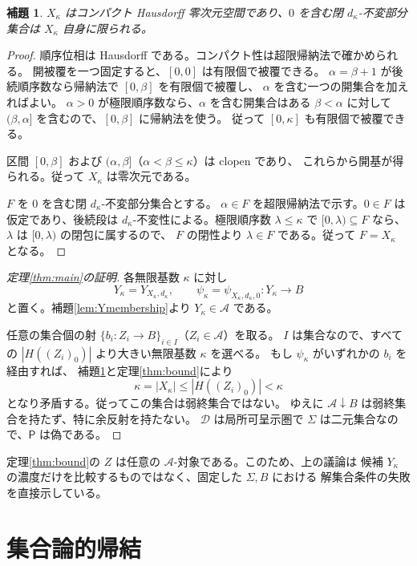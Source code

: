 \documentclass[a4paper,11pt]{ltjsarticle}
\theoremstyle{japaneseplain}
\newtheorem{lemma}[theorem]{補題}
\newcommand{\D}{\mathcal D}
\newcommand{\A}{\mathcal A}
\newcommand{\Pstmt}{\mathsf P}
\begin{document}
\begin{lemma}\label{lem:ordinal}
$X_\kappa$ はコンパクト Hausdorff 零次元空間であり、$0$ を含む閉 $d_\kappa$-不変部分集合は
$X_\kappa$ 自身に限られる。
\end{lemma}
\begin{proof}
順序位相は Hausdorff である。コンパクト性は超限帰納法で確かめられる。
開被覆を一つ固定すると、$[0,0]$ は有限個で被覆できる。
$\alpha=\beta+1$ が後続順序数なら帰納法で $[0,\beta]$ を有限個で被覆し、
$\alpha$ を含む一つの開集合を加えればよい。
$\alpha>0$ が極限順序数なら、$\alpha$ を含む開集合はある $\beta<\alpha$ に対して
$(\beta,\alpha]$ を含むので、$[0,\beta]$ に帰納法を使う。
従って $[0,\kappa]$ も有限個で被覆できる。

区間 $[0,\beta]$ および $(\alpha,\beta]$（$\alpha<\beta\le\kappa$）は clopen であり、
これらから開基が得られる。従って $X_\kappa$ は零次元である。

$F$ を $0$ を含む閉 $d_\kappa$-不変部分集合とする。
$\alpha\in F$ を超限帰納法で示す。$0\in F$ は仮定であり、後続段は
$d_\kappa$-不変性による。極限順序数 $\lambda\le\kappa$ で
$[0,\lambda)\subseteq F$ なら、$\lambda$ は $[0,\lambda)$ の閉包に属するので、
$F$ の閉性より $\lambda\in F$ である。従って $F=X_\kappa$ となる。
\end{proof}

\begin{proof}[定理\ref{thm:main}の証明]
各無限基数 $\kappa$ に対し
\[
 Y_\kappa=Y_{X_\kappa,d_\kappa},\qquad
 \psi_\kappa=\psi_{X_\kappa,d_\kappa,0}:Y_\kappa\to B
\]
と置く。補題\ref{lem:Ymembership}より $Y_\kappa\in\A$ である。

任意の集合個の射 $\{b_i:Z_i\to B\}_{i\in I}$（$Z_i\in\A$）を取る。
$I$ は集合なので、すべての $|H((Z_i)_0)|$ より大きい無限基数 $\kappa$ を選べる。
もし $\psi_\kappa$ がいずれかの $b_i$ を経由すれば、
補題\ref{lem:ordinal}と定理\ref{thm:bound}により
\[
 \kappa=|X_\kappa|\le |H((Z_i)_0)|<\kappa
\]
となり矛盾する。従ってこの集合は弱終集合ではない。
ゆえに $\A\mathbin{\downarrow}B$ は弱終集合を持たず、特に余反射を持たない。
$\D$ は局所可呈示圏で $\Sigma$ は二元集合なので、$\Pstmt$ は偽である。
\end{proof}

定理\ref{thm:bound}の $Z$ は任意の $\A$-対象である。このため、上の議論は
候補 $Y_\kappa$ の濃度だけを比較するものではなく、固定した $\Sigma,B$ における
解集合条件の失敗を直接示している。

\section{集合論的帰結}\label{sec:consequences}
\end{document}
